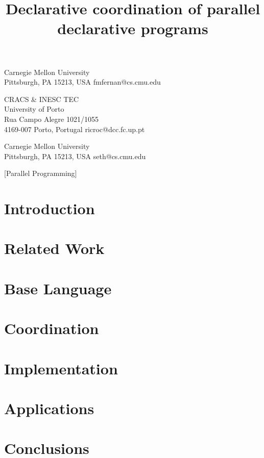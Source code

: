 \documentclass[pldi,blind,clearpagebib]{sigplanconf-pldi15}
\begin{document}
%
%

\title{Declarative coordination of parallel declarative programs}
           {Carnegie Mellon University\\Pittsburgh, PA 15213, USA}
           {fmfernan@cs.cmu.edu}

           {CRACS \& INESC TEC\\University of Porto\\Rua Campo Alegre 1021/1055\\4169-007 Porto, Portugal}
           {ricroc@dcc.fc.up.pt}

           {Carnegie Mellon University\\Pittsburgh, PA 15213, USA}
           {seth@cs.cmu.edu}

\newcommand{\scare}[1]{``#1''} 

\maketitle
\begin{abstract}

\end{abstract}

[Parallel Programming]



\section{Introduction}


\section{Related Work}


\section{Base Language}\label{sec:language}


\section{Coordination}\label{sec:coordination}


\section{Implementation}\label{sec:implementation}


\section{Applications}\label{sec:applications}


\section{Conclusions}




\end{document}
